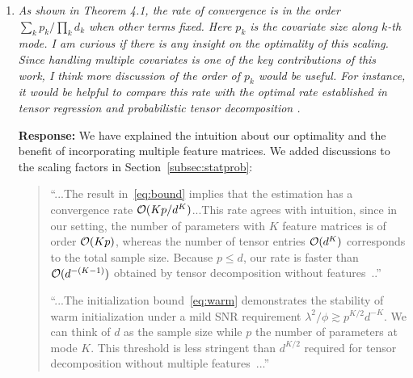 \documentclass[11pt]{article}
\theoremstyle{plain}
\newtheorem{thm}{Theorem}[section]
\theoremstyle{definition}
\begin{document}
\begin{enumerate}[wide, labelwidth=!, labelindent=0pt]
\begin{quote}
As a direct consequence, we find the optimal iteration $t$ after which the algorithmic error is negligible compared to statistical error. 
\begin{thm}[Statistical rate for local optimizers]\label{thm:local}Consider the same condition as in Proposition~\ref{lem:ini} and the outputs by combining algorithms 1 and 2. There exists a constant $C>0$, such that, after $t\gtrsim K\log_{1/\rho}p$ iterations, our algorithm outputs satisfies
\[
\max_{k\in[K]}\textup{sin}^2 \Theta(\trueM, \hat \mM^{(t)}_k) \lesssim {\phi p\over \lambda^2d^K}, \quad \FnormSize{}{\trueB- \hat \tB^{(t)}}^2 \lesssim {\phi(r^K+Kpr)\over d^K}.
\]
\end{thm}


In practice, the signal level $\lambda$ is unknown, so the assumption in Theorem~\ref{thm:local} is challenging to verify in practice. We supply the theory by providing an alternative scheme -- random initialization -- and investigate its empirical performance...''
    
    \end{quote}
    
    \item \textit{As shown in Theorem 4.1, the rate of convergence is in the order $\sum_k p_k/ \prod_k d_k$ when other terms fixed. Here $p_k$ is the covariate size along $k$-th mode. I am curious if there is any insight on the optimality of this scaling. Since handling multiple covariates is one of the key contributions of this work, I think more discussion of the order of $p_k$ would be useful. For instance, it would be helpful to compare this rate with the optimal rate established in tensor regression \citep{han2020optimal} and probabilistic tensor decomposition \citep{wang2020learning}. }
    
    {\bf Response:} We have explained the intuition about our optimality and the benefit of incorporating multiple feature matrices. We added discussions to the scaling factors in Section~\ref{subsec:statprob}:
    

\begin{quote}
``...The result in~\eqref{eq:bound} implies that the estimation has a convergence rate $\mathcal{O}(Kp/d^{K})$...This rate agrees with intuition, since in our setting, the number of parameters with $K$ feature matrices is of order $\mathcal{O}(Kp)$, whereas the number of tensor entries $\mathcal{O}(d^K)$ corresponds to the total sample size. Because $p\leq d$, our rate is faster than $\mathcal{O}(d^{-(K-1)})$ obtained by tensor decomposition without features~\citep{wang2020learning}..''

``...The initialization bound~\eqref{eq:warm} demonstrates the stability of warm initialization under a mild SNR requirement $\lambda^2/\phi \gtrsim p^{K/2}d^{-K}$. We can think of $d$ as the sample size while $p$ the number of parameters at mode $K$. This threshold is less stringent than $d^{K/2}$ required for tensor decomposition without multiple features~\citep{han2020optimal,zhang2018tensor}...''
\end{quote}
\end{enumerate}
\end{document}
